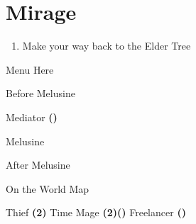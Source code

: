 \chapter{Mirage}

\vspace{\baselineskip}

\begin{paracol}{2}

\begin{enumerate}
    \item Make your way back to the Elder Tree
\end{enumerate}

\switchcolumn
\begin{misc}{Menu Here}
\end{misc}

\switchcolumn
\begin{menu}{Before Melusine}
    \varwb
    \begin{jobMenu}
        \cara Mediator \textbf{(\pointUp)} \ability{!\white}
    \end{jobMenu}
    \begin{magicMenu}
        \cara \cure \space \then {}
    \end{magicMenu}
    \varwe
\end{menu}

\begin{boss}{Melusine}
    \varwb
    \begin{round}{1}
        \cara \leftCommand{\release}
        \faris \leftCommand{\release}
        \bartz \rightCommand{\black} \then \fire
    \end{round}
    \varwe
\end{boss}

\switchcolumn*
\vspace{-1cm}
\begin{steproute}{After Melusine}
\end{steproute}

\switchcolumn
\begin{menu}{On the World Map}
    \varwb
    \begin{itemMenu}
        \phoenixDownMenu {}
        \antidoteMenu {}
    \end{itemMenu}
    \begin{jobMenu}
        \cara Thief \textbf{(2\pointRight)} \ability{!\escape}
        \lenna Time Mage \textbf{(2\pointLeft)(\pointUp)}
        \bartz Freelancer \textbf{(\pointLeft)} \ability{!\escape \space !\combine}
    \end{jobMenu}
    \varwe
\end{menu}


\end{paracol}
